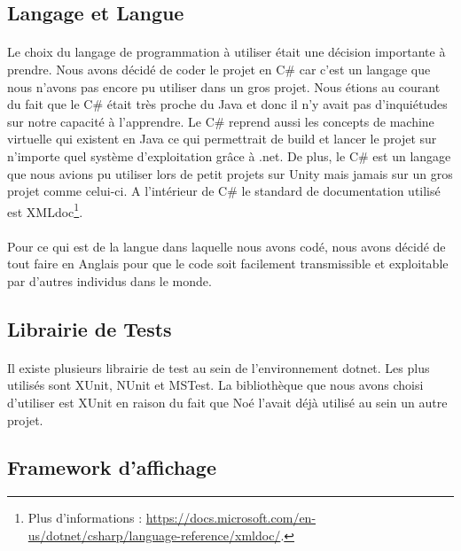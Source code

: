 \documentclass{EPUProjetDi}
\begin{document}
\subsection{Langage et Langue}

\paragraph{}
Le choix du langage de programmation à utiliser était une décision importante à prendre. Nous avons décidé de coder le projet en C\# car c'est un langage que nous
n'avons pas encore pu utiliser dans un gros projet. Nous étions au courant du fait que le C\# était très proche du Java et donc il n'y avait pas
d'inquiétudes sur notre capacité à l'apprendre. Le C\# reprend aussi les concepts de machine virtuelle qui existent en Java ce qui permettrait de build et lancer le projet
sur n'importe quel système d'exploitation grâce à .net. 
De plus, le C\# est un langage que nous avions pu utiliser lors de petit projets sur Unity mais jamais sur un gros projet comme celui-ci. 
A l'intérieur de C\# le standard de documentation utilisé est XMLdoc\footnote{Plus d'informations : \url{https://docs.microsoft.com/en-us/dotnet/csharp/language-reference/xmldoc/}.}.

\paragraph{}
Pour ce qui est de la langue dans laquelle nous avons codé, nous avons décidé de tout faire en Anglais pour que le code soit facilement
transmissible et exploitable par d'autres individus dans le monde.

\subsection{Librairie de Tests}

\paragraph{}
Il existe plusieurs librairie de test au sein de l'environnement dotnet. Les plus utilisés sont XUnit, NUnit et MSTest.
La bibliothèque que nous avons choisi d'utiliser est XUnit en raison du fait que Noé l'avait déjà utilisé au sein un autre projet.

\subsection{Framework d'affichage}
\end{document}
